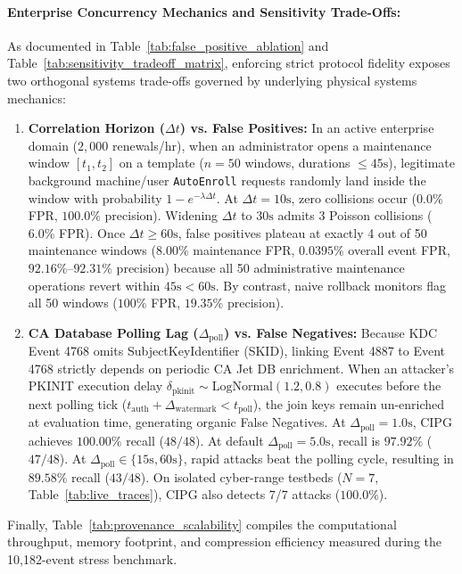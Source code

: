 \paragraph{Enterprise Concurrency Mechanics and Sensitivity Trade-Offs:}
As documented in Table~\ref{tab:false_positive_ablation} and Table~\ref{tab:sensitivity_tradeoff_matrix}, enforcing strict protocol fidelity exposes two orthogonal systems trade-offs governed by underlying physical systems mechanics:
\begin{enumerate}
    \item \textbf{Correlation Horizon ($\Delta t$) vs. False Positives:} In an active enterprise domain ($2,000$ renewals/hr), when an administrator opens a maintenance window $[t_1, t_2]$ on a template ($n=50$ windows, durations $\le 45\text{s}$), legitimate background machine/user \texttt{AutoEnroll} requests randomly land inside the window with probability $1 - e^{-\lambda \Delta t}$. At $\Delta t = 10\text{s}$, zero collisions occur ($0.0\%$ FPR, $100.0\%$ precision). Widening $\Delta t$ to $30\text{s}$ admits 3 Poisson collisions ($6.0\%$ FPR). Once $\Delta t \ge 60\text{s}$, false positives plateau at exactly 4 out of 50 maintenance windows ($8.00\%$ maintenance FPR, $0.0395\%$ overall event FPR, $92.16\%$--$92.31\%$ precision) because all 50 administrative maintenance operations revert within $45\text{s} < 60\text{s}$. By contrast, naive rollback monitors flag all 50 windows ($100\%$ FPR, $19.35\%$ precision).
    \item \textbf{CA Database Polling Lag ($\Delta_{\text{poll}}$) vs. False Negatives:} Because KDC Event 4768 omits SubjectKeyIdentifier (SKID), linking Event 4887 to Event 4768 strictly depends on periodic CA Jet DB enrichment. When an attacker's PKINIT execution delay $\delta_{\text{pkinit}} \sim \text{LogNormal}(1.2, 0.8)$ executes before the next polling tick ($t_{\text{auth}} + \Delta_{\text{watermark}} < t_{\text{poll}}$), the join keys remain un-enriched at evaluation time, generating organic False Negatives. At $\Delta_{\text{poll}} = 1.0\text{s}$, CIPG achieves $100.00\%$ recall ($48/48$). At default $\Delta_{\text{poll}} = 5.0\text{s}$, recall is $97.92\%$ ($47/48$). At $\Delta_{\text{poll}} \in \{15\text{s}, 60\text{s}\}$, rapid attacks beat the polling cycle, resulting in $89.58\%$ recall ($43/48$). On isolated cyber-range testbeds ($N=7$, Table~\ref{tab:live_traces}), CIPG also detects 7/7 attacks ($100.0\%$).
\end{enumerate}

Finally, Table~\ref{tab:provenance_scalability} compiles the computational throughput, memory footprint, and compression efficiency measured during the 10,182-event stress benchmark.

